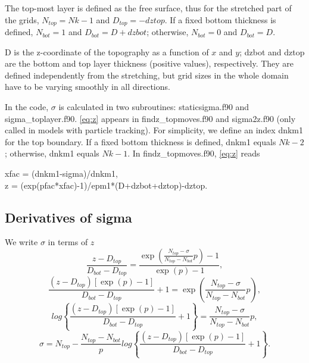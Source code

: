 \documentclass[12pt,letterpaper,titlepage]{article}
\newcommand{\Blue}[1]{{\color{blue}#1}}
\begin{document}
The top-most layer is defined as the free surface, thus for the stretched part of the grids, $N_{top}=Nk-1$ and $D_{top}=-dztop$. If a fixed bottom thickness is defined, $N_{bot}=1$ and $D_{bot}=D+dzbot$; otherwise, $N_{bot}=0$ and $D_{bot}=D$.\par

\Blue{D} is the z-coordinate of the topography as a function of $x$ and $y$; \Blue{dzbot} and \Blue{dztop} are the bottom and top layer thickness (positive values), respectively. They are defined independently from the stretching, but grid sizes in the whole domain have to be varying smoothly in all directions.\par

In the code, $\sigma$ is calculated in two subroutines: \Blue{staticsigma.f90} and \Blue{sigma\_toplayer.f90}. \eqref{eq:z} appears in \Blue{findz\_topmoves.f90} and \Blue{sigma2z.f90} (only called in models with particle tracking). For simplicity, we define an index \Blue{dnkm1} for the top boundary. If a fixed bottom thickness is defined, \Blue{dnkm1} equals $Nk-2$; otherwise, \Blue{dnkm1} equals $Nk-1$. In findz\_topmoves.f90, \eqref{eq:z} reads \par
\begin{center}
xfac = (dnkm1-sigma)/dnkm1, \\
z = (exp(pfac*xfac)-1)/epm1*(D+dzbot+dztop)-dztop.
\end{center}

\subsection{Derivatives of sigma}

We write $\sigma$ in terms of $z$
\begin{equation}
  \frac{z-D_{top}}{D_{bot}-D_{top}}= \frac{\exp\left(\frac{N_{top}-\sigma}{N_{top}-N_{bot}} p\right) - 1}{\exp(p)-1}, \nonumber 
\end{equation}
\begin{equation}
  \frac{(z-D_{top})[\exp(p)-1]}{D_{bot}-D_{top}} +1 = \exp\left(\frac{N_{top}-\sigma}{N_{top}-N_{bot}}p \right), \nonumber 
\end{equation}
\begin{equation}
  log{\left\{\frac{(z-D_{top})[\exp(p)-1]}{D_{bot}-D_{top}} +1 \right\}} = \frac{N_{top}-\sigma}{N_{top}-N_{bot}}p, \nonumber 
\end{equation}
\begin{equation}
  \sigma = N_{top} - \frac{N_{top}-N_{bot}}{p} log{\left\{\frac{(z-D_{top})[\exp(p)-1]}{D_{bot}-D_{top}} +1 \right\}}. \nonumber 
\end{equation}
\end{document}
